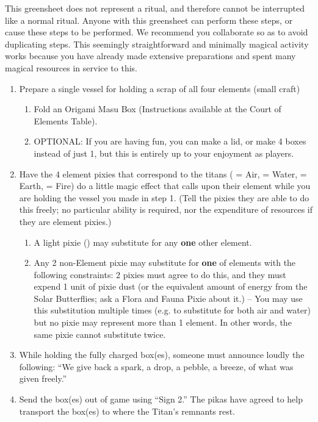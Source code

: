 \documentclass[green]{PP}
\begin{document}
\name{\gTitan{}}

This greensheet does not represent a ritual, and therefore cannot be interrupted like a normal ritual. Anyone with this greensheet can perform these steps, or cause these steps to be performed. We recommend you collaborate so as to avoid duplicating steps. This seemingly straightforward and minimally magical activity works because you have already made extensive preparations and spent many magical resources in service to this.

\begin{enumerate}
	\item Prepare a single vessel for holding a scrap of all four elements (small craft)
	\begin{enumerate}
		\item Fold an Origami Masu Box (Instructions available at the Court of Elements Table).
		\item OPTIONAL: If you are having fun, you can make a lid, or make 4 boxes instead of just 1, but this is entirely up to your enjoyment as players.
	\end{enumerate}
	\item Have the 4 element pixies that correspond to the titans (\cEHead{} = Air, \cELove{} = Water, \cETitan{} = Earth, \cEAirship{} = Fire) do a little magic effect that calls upon their element while you are holding the vessel you made in step 1. (Tell the pixies they are able to do this freely; no particular ability is required, nor the expenditure of resources if they are element pixies.)
	\begin{enumerate}
		\item A light pixie (\cESweet{}) may substitute for any \textbf{one} other element.
		\item Any 2 non-Element pixie may substitute for \textbf{one} of elements with the following constraints: 2 pixies must agree to do this, and they must expend 1 unit of pixie dust (or the equivalent amount of energy from the Solar Butterflies; ask a Flora and Fauna Pixie about it.) -- You may use this substitution multiple times (e.g. to substitute for both air and water) but no pixie may represent more than 1 element. In other words, the same pixie cannot substitute twice.
	\end{enumerate}
	\item While holding the fully charged box(es), someone must announce loudly the following: “We give back a spark, a drop, a pebble, a breeze, of what was given freely.”
	\item Send the box(es) out of game using “Sign 2.” The pikas have agreed to help transport the box(es) to where the Titan’s remnants rest.

\end{enumerate}
\end{document}
